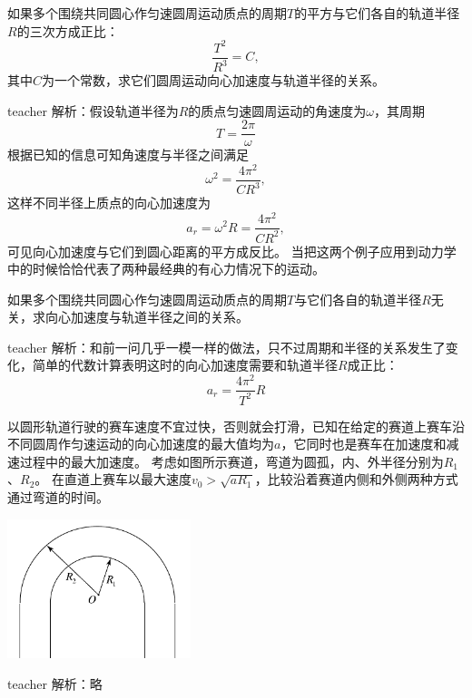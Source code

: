 \begin{example}
如果多个围绕共同圆心作匀速圆周运动质点的周期$T$的平方与它们各自的轨道半径$R$的三次方成正比：
\[ \frac{T^2}{R^3} = C, \]
其中$C$为一个常数，求它们圆周运动向心加速度与轨道半径的关系。
\begin{taggedblock}{teacher}
\newline
解析：假设轨道半径为$R$的质点匀速圆周运动的角速度为$\omega$，其周期
\[ T = \frac{2\pi}{\omega} \]
根据已知的信息可知角速度与半径之间满足
\[  \omega^2 = \frac{4\pi^2}{CR^3}, \]
这样不同半径上质点的向心加速度为
\[ a_r = \omega^2R = \frac{4\pi^2}{CR^2}, \]
可见向心加速度与它们到圆心距离的平方成反比。
当把这两个例子应用到动力学中的时候恰恰代表了两种最经典的有心力情况下的运动。
\end{taggedblock}
\end{example}

\begin{example}
如果多个围绕共同圆心作匀速圆周运动质点的周期$T$与它们各自的轨道半径$R$无关，求向心加速度与轨道半径之间的关系。
\begin{taggedblock}{teacher}
\newline
解析：和前一问几乎一模一样的做法，只不过周期和半径的关系发生了变化，简单的代数计算表明这时的向心加速度需要和轨道半径$R$成正比：
\[a_r = \frac{4\pi^2}{T^2}R\]
\end{taggedblock}
\end{example}




\begin{example}
以圆形轨道行驶的赛车速度不宜过快，否则就会打滑，已知在给定的赛道上赛车沿不同圆周作匀速运动的向心加速度的最大值均为$a$，它同时也是赛车在加速度和减速过程中的最大加速度。
考虑如图所示赛道，弯道为圆孤，内、外半径分别为$R_1$、$R_2$。
在直道上赛车以最大速度$v_0>\sqrt{aR_1}$，比较沿着赛道内侧和外侧两种方式通过弯道的时间。
\begin{flushright}
\includegraphics[width=0.4\textwidth]{images/motion-problem-34.pdf}
\end{flushright}

\begin{taggedblock}{teacher}
\noindent
解析：略
\end{taggedblock}
\end{example}

